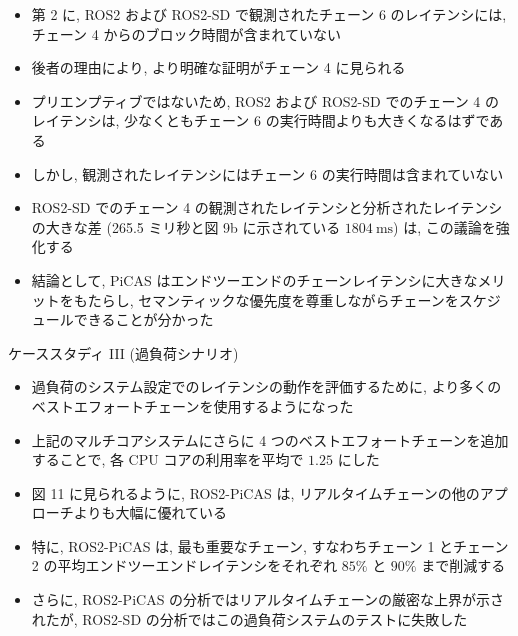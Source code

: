 \begin{frame}{}
    \begin{itemize}
        \item 第 2 に, ROS2 および ROS2-SD で観測されたチェーン 6 のレイテンシには, チェーン 4 からのブロック時間が含まれていない
\item 後者の理由により, より明確な証明がチェーン 4 に見られる
\item プリエンプティブではないため, ROS2 および ROS2-SD でのチェーン 4 のレイテンシは, 少なくともチェーン 6 の実行時間よりも大きくなるはずである
\item しかし, 観測されたレイテンシにはチェーン 6 の実行時間は含まれていない
\item ROS2-SD でのチェーン 4 の観測されたレイテンシと分析されたレイテンシの大きな差 (265.5 ミリ秒と図 9b に示されている $1804 \mathrm{~ms}$) は, この議論を強化する
    \end{itemize}
\end{frame}

\begin{frame}{}
    \begin{itemize}
        \item 結論として, PiCAS はエンドツーエンドのチェーンレイテンシに大きなメリットをもたらし, セマンティックな優先度を尊重しながらチェーンをスケジュールできることが分かった
    \end{itemize}
\end{frame}

\begin{frame}{ケーススタディ III (過負荷シナリオ)}
    \begin{itemize}
        \item 過負荷のシステム設定でのレイテンシの動作を評価するために, より多くのベストエフォートチェーンを使用するようになった
\item 上記のマルチコアシステムにさらに 4 つのベストエフォートチェーンを追加することで, 各 CPU コアの利用率を平均で $1.25$ にした
\item 図 11 に見られるように, ROS2-PiCAS は, リアルタイムチェーンの他のアプローチよりも大幅に優れている
\item 特に, ROS2-PiCAS は, 最も重要なチェーン, すなわちチェーン 1 とチェーン 2 の平均エンドツーエンドレイテンシをそれぞれ $85 \%$ と $90 \%$ まで削減する
\item さらに, ROS2-PiCAS の分析ではリアルタイムチェーンの厳密な上界が示されたが, ROS2-SD の分析ではこの過負荷システムのテストに失敗した
    \end{itemize}
\end{frame}

